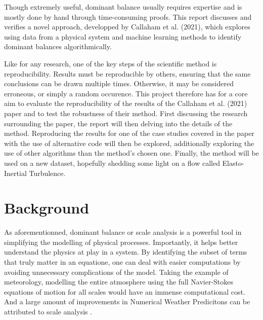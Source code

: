 \documentclass[12pt]{report} %
\begin{document}
\vspace{5mm}

Though extremely useful, dominant balance usually requires expertise and is mostly done by hand through time-consuming proofs. This report discusses and verifies a novel approach, developped by Callaham et al. (2021)\cite{callaham2021learning}, which explores using data from a physical system and machine learning methods to identify dominant balances algorithmically.

\vspace{5mm}

Like for any research, one of the key steps of the scientific method is reproducibility. Results must be reproducible by others, ensuring that the same conclusions can be drawn multiple times. Otherwise, it may be considered erroneous, or simply a random occurence. This project therefore has for a core aim to evaluate the reproducibility of the results of the Callaham et al. (2021)\cite{callaham2021learning} paper and to test the robustness of their method. First discussing the research surrounding the paper, the report will then delving into the details of the method. Reproducing the results for one of the case studies covered in the paper with the use of alternative code will then be explored, additionally exploring the use of other algorithms than the method's chosen one. Finally, the method will be used on a new dataset, hopefully shedding some light on a flow called Elasto-Inertial Turbulence.



\chapter{Background}


As aforementionned, dominant balance or scale analysis is a powerful tool in simplifying the modelling of physical processes. Importantly, it helps better understand the physics at play in a system. By identifying the subset of terms that truly matter in an equatione, one can deal with easier computations by avoiding unnecessary complications of the model. Taking the example of meteorology, modelling the entire atmosphere using the full Navier-Stokes equations of motion for all scales would have an immense computational cost. And a large amount of improvements in Numerical Weather Predicitons can be attributed to scale analysis \cite{charney1947dynamics, phillips1963geostrophic, burger1958scale, yano2009scale}.

\vspace{5mm}
\end{document}
